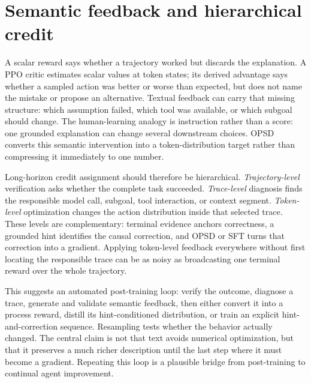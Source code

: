 \section{Semantic feedback and hierarchical credit}

A scalar reward says whether a trajectory worked but discards the explanation. A PPO
critic estimates scalar values at token states; its derived advantage says whether a
sampled action was better or worse than expected, but does not name the mistake or propose
an alternative. Textual feedback can carry that missing structure: which assumption
failed, which tool was available, or which subgoal should change. The human-learning
analogy is instruction rather than a score: one grounded explanation can change several
downstream choices. OPSD converts this semantic intervention into a token-distribution
target rather than compressing it immediately to one number.

Long-horizon credit assignment should therefore be hierarchical. \emph{Trajectory-level}
verification asks whether the complete task succeeded. \emph{Trace-level} diagnosis finds
the responsible model call, subgoal, tool interaction, or context segment.
\emph{Token-level} optimization changes the action distribution inside that selected
trace. These levels are complementary: terminal evidence anchors correctness, a grounded
hint identifies the causal correction, and OPSD or SFT turns that correction into a
gradient. Applying token-level feedback everywhere without first locating the responsible
trace can be as noisy as broadcasting one terminal reward over the whole trajectory.

This suggests an automated post-training loop: verify the outcome, diagnose a trace,
generate and validate semantic feedback, then either convert it into a process reward,
distill its hint-conditioned distribution, or train an explicit
hint-and-correction sequence. Resampling tests whether the behavior actually changed. The
central claim is not that text avoids numerical optimization, but that it preserves a
much richer description until the last step where it must become a gradient. Repeating
this loop is a plausible bridge from post-training to continual agent improvement.
